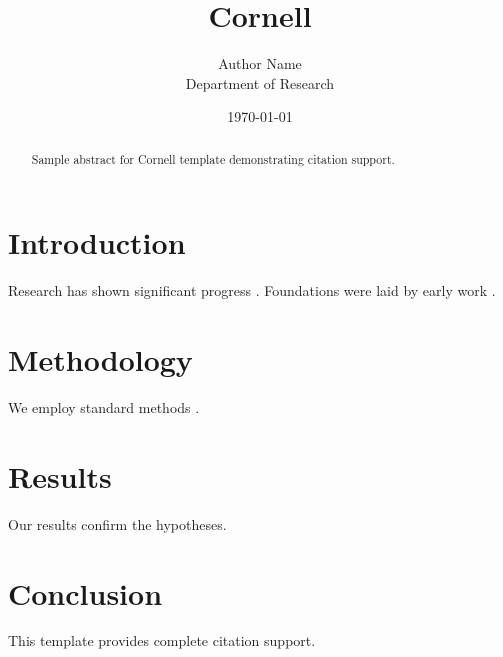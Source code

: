 \documentclass{thesis_cornell}
\title{Cornell}
\author{Author Name \\ \small Department of Research}
\date{\today}
\begin{document}
\maketitle

\begin{abstract}
Sample abstract for Cornell template demonstrating citation support.
\end{abstract}

\section{Introduction}
Research has shown significant progress \citep{einstein1905}. Foundations were laid by early work \citep{turing1950}.

\section{Methodology}
We employ standard methods \citep{knuth1984}.

\section{Results}
Our results confirm the hypotheses.

\section{Conclusion}
This template provides complete citation support.



\end{document}

